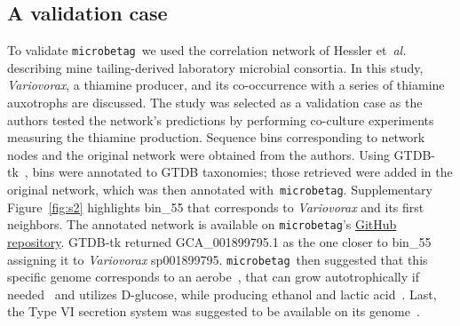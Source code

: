 \documentclass[sn-mathphys,Numbered]{sn-jnl}  %
\theoremstyle{thmstyleone}%
\theoremstyle{thmstyletwo}%
\theoremstyle{thmstylethree}%
\newcommand{\microbetag}{\texttt{microbetag}}
\begin{document}
    \subsection*{A validation case}
    \label{subsec:validation}


        To validate \microbetag~we used the correlation network of Hessler et~\textit{al.}~\cite{hessler2023vitamin} describing mine tailing-derived laboratory microbial consortia.
        In this study, \textit{Variovorax}, a thiamine producer, and its co-occurrence with a series of thiamine auxotrophs are discussed.
        The study was selected as a validation case as the authors tested the network's predictions by performing co-culture experiments measuring the thiamine production.
        Sequence bins corresponding to network nodes and the original network were obtained from the authors.
        Using GTDB-tk~\cite{chaumeil2020gtdb}, bins were annotated to GTDB taxonomies; those retrieved were added in the original network, which was then annotated with~\microbetag.
        Supplementary Figure~\ref{fig:s2} highlights bin\_55 that corresponds to \textit{Variovorax} and its first neighbors.
        The annotated network is available on \microbetag's \href{https://github.com/hariszaf/microbetag/blob/develop/tests/validation_case/microbetag_val.cx}{GitHub repository}.
        GTDB-tk returned GCA\_001899795.1 as the one closer to bin\_55 assigning it to \textit{Variovorax} sp001899795.
        \microbetag~then suggested that this specific genome corresponds to an aerobe~\cite{aerobeVariovorax}, that can grow autotrophically if needed~\cite{autotrophVariovorax} and utilizes D-glucose, while producing ethanol and lactic acid~\cite{lacticVariovorax}. 
        Last, the Type VI secretion system was suggested to be available on its genome~\cite{t6ssVariovorax}.
\end{document}
